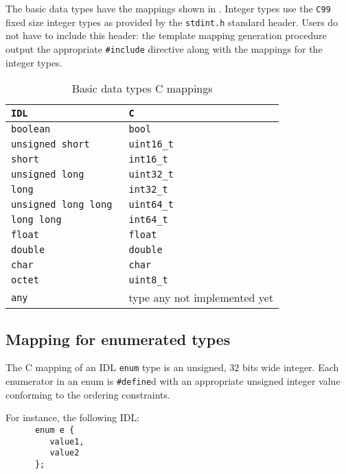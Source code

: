 The     basic     data     types     have     the     mappings     shown     in
.   Integer  types
use the  {\tt C99} fixed size integer  types as provided by  the {\tt stdint.h}
standard header. Users do not have to include this header: the template mapping
generation  procedure output  the appropriate  {\tt \#include}  directive along
with the mappings for the integer types.

\begin{table}
\caption{Basic data types C mappings}
\centering
\begin{tabular}{|ll|}
\doublehline
{\tt\bfseries IDL} & {\tt\bfseries C}\\
\hline
\tt boolean              & \tt bool\\
\tt unsigned short       & \tt uint16\_t\\
\tt short                & \tt int16\_t\\
\tt unsigned long        & \tt uint32\_t\\
\tt long                 & \tt int32\_t\\
\tt unsigned long long   & \tt uint64\_t\\
\tt long long            & \tt int64\_t\\
\tt float                & \tt float\\
\tt double               & \tt double\\
\tt char                 & \tt char\\
\tt octet                & \tt uint8\_t\\
\tt any                  & type any not implemented yet\\
\hline
\end{tabular}
\label{table:mapping:cbasic}
\end{table}


\subsection{Mapping for enumerated types}

The C mapping of an IDL {\tt enum} type is an unsigned, $32$ bits wide integer.
Each  enumerator in an  enum is  {\tt \#define}d  with an  appropriate unsigned
integer  value  conforming  to  the  ordering constraints.

For instance, the following IDL:\hfill\\
\verb|      enum e {|\hfill\\
\verb|         value1,|\hfill\\
\verb|         value2|\hfill\\
\verb|      };|\hfill\\

